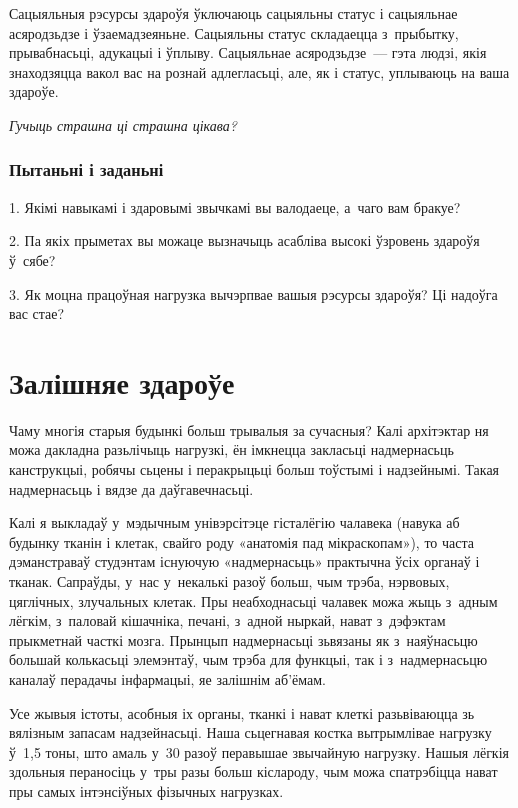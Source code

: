 Сацыяльныя рэсурсы здароўя ўключаюць сацыяльны статус і сацыяльнае асяродзьдзе і ўзаемадзеяньне. Сацыяльны статус складаецца з~прыбытку, прывабнасьці, адукацыі і ўплыву. Сацыяльнае асяродзьдзе~--- гэта людзі, якія знаходзяцца вакол вас на рознай адлегласьці, але, як і статус, уплываюць на ваша здароўе. 

\emph{Гучыць страшна ці страшна цікава?}


\subsubsection{Пытаньні і заданьні}

1. Якімі навыкамі і здаровымі звычкамі вы валодаеце, а~чаго вам бракуе?

2. Па якіх прыметах вы можаце вызначыць асабліва высокі ўзровень здароўя ў~сябе?

3. Як моцна працоўная нагрузка вычэрпвае вашыя рэсурсы здароўя? Ці надоўга вас стае?


\section{Залішняе здароўе}


Чаму многія старыя будынкі больш трывалыя за сучасныя? Калі архітэктар ня можа дакладна разьлічыць нагрузкі, ён імкнецца закласьці надмернасьць канструкцыі, робячы сьцены і перакрыцьці больш тоўстымі і надзейнымі. Такая надмернасьць і вядзе да даўгавечнасьці.

Калі я выкладаў у~мэдычным унівэрсітэце гісталёгію чалавека (навука аб будынку тканін і клетак, свайго роду «анатомія пад мікраскопам»), то часта дэманстраваў студэнтам існуючую «надмернасьць» практычна ўсіх органаў і тканак. Сапраўды, у~нас у~некалькі разоў больш, чым трэба, нэрвовых, цяглічных, злучальных клетак. Пры неабходнасьці чалавек можа жыць з~адным лёгкім, з~паловай кішачніка, печані, з~адной ныркай, нават з~дэфэктам прыкметнай часткі мозга. Прынцып надмернасьці зьвязаны як з~наяўнасьцю большай колькасьці элемэнтаў, чым трэба для функцыі, так і з~надмернасьцю каналаў перадачы інфармацыі, яе залішнім аб'ёмам.

Усе жывыя істоты, асобныя іх органы, тканкі і нават клеткі разьвіваюцца зь вялізным запасам надзейнасьці. Наша сьцегнавая костка вытрымлівае нагрузку ў~1,5 тоны, што амаль у~30 разоў перавышае звычайную нагрузку. Нашыя лёгкія здольныя пераносіць у~тры разы больш кіслароду, чым можа спатрэбіцца нават пры самых інтэнсіўных фізычных нагрузках.

